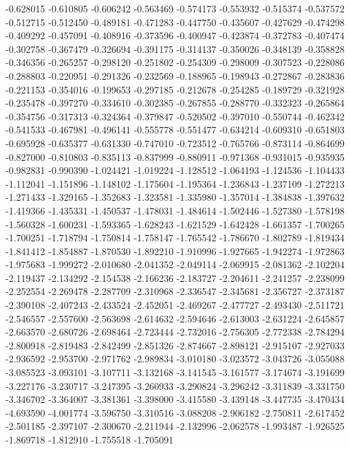 -0.628015
-0.610805
-0.606242
-0.563469
-0.574173
-0.553932
-0.515374
-0.537572
-0.512715
-0.512450
-0.489181
-0.471283
-0.447750
-0.435607
-0.427629
-0.474298
-0.409292
-0.457091
-0.408916
-0.373596
-0.400947
-0.423874
-0.372783
-0.407474
-0.302758
-0.367479
-0.326694
-0.391175
-0.314137
-0.350026
-0.348139
-0.358828
-0.346356
-0.265257
-0.298120
-0.251802
-0.254309
-0.298009
-0.307523
-0.228086
-0.288803
-0.220951
-0.291326
-0.232569
-0.188965
-0.198943
-0.272867
-0.283836
-0.221153
-0.354016
-0.199653
-0.297185
-0.212678
-0.254285
-0.189729
-0.321928
-0.235478
-0.397270
-0.334610
-0.302385
-0.267855
-0.288770
-0.332323
-0.265864
-0.354756
-0.317313
-0.324364
-0.379847
-0.520502
-0.397010
-0.550744
-0.462342
-0.541533
-0.467981
-0.496141
-0.555778
-0.551477
-0.634214
-0.609310
-0.651803
-0.695928
-0.635377
-0.631330
-0.747010
-0.723512
-0.765766
-0.873114
-0.864699
-0.827000
-0.810803
-0.835113
-0.837999
-0.880911
-0.971368
-0.931015
-0.935935
-0.982831
-0.990390
-1.024421
-1.019224
-1.128512
-1.064193
-1.124536
-1.104433
-1.112041
-1.151896
-1.148102
-1.175604
-1.195364
-1.236843
-1.237109
-1.272213
-1.271433
-1.329165
-1.352683
-1.323581
-1.335980
-1.357014
-1.384838
-1.397632
-1.419366
-1.435331
-1.450537
-1.478031
-1.484614
-1.502446
-1.527380
-1.578198
-1.560328
-1.600231
-1.593365
-1.628243
-1.621529
-1.642428
-1.661357
-1.700265
-1.700251
-1.718794
-1.750814
-1.758147
-1.765542
-1.786670
-1.802789
-1.819434
-1.841412
-1.854887
-1.870530
-1.892210
-1.910996
-1.927665
-1.942274
-1.972863
-1.975683
-1.999272
-2.010680
-2.041352
-2.049114
-2.069915
-2.081362
-2.102204
-2.119437
-2.134292
-2.154538
-2.166236
-2.183727
-2.204611
-2.241257
-2.238099
-2.252554
-2.269478
-2.287709
-2.310968
-2.336547
-2.345681
-2.356727
-2.373187
-2.390108
-2.407243
-2.433524
-2.452051
-2.469267
-2.477727
-2.493430
-2.511721
-2.546557
-2.557600
-2.563698
-2.614632
-2.594646
-2.613003
-2.631224
-2.645857
-2.663570
-2.680726
-2.698464
-2.723444
-2.732016
-2.756305
-2.772338
-2.784294
-2.800918
-2.819483
-2.842499
-2.851326
-2.874667
-2.898121
-2.915107
-2.927033
-2.936592
-2.953700
-2.971762
-2.989834
-3.010180
-3.023572
-3.043726
-3.055088
-3.085523
-3.093101
-3.107711
-3.132168
-3.141545
-3.161577
-3.174674
-3.191699
-3.227176
-3.230717
-3.247395
-3.260933
-3.290824
-3.296242
-3.311839
-3.331750
-3.346702
-3.364007
-3.381361
-3.398000
-3.415580
-3.439148
-3.447735
-3.470434
-4.693590
-4.001774
-3.596750
-3.310516
-3.088208
-2.906182
-2.750811
-2.617452
-2.501185
-2.397107
-2.300670
-2.211944
-2.132996
-2.062578
-1.993487
-1.926525
-1.869718
-1.812910
-1.755518
-1.705091
